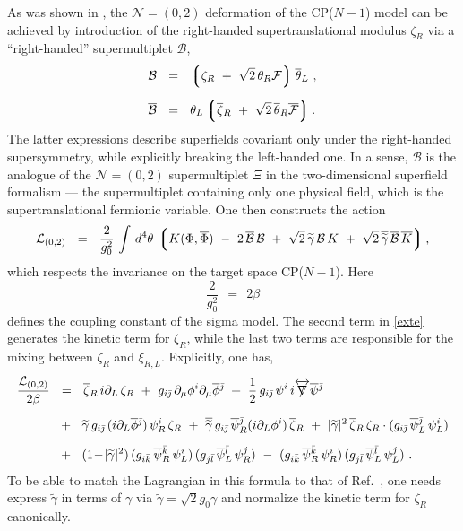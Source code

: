 \documentclass[12pt]{article}
\def\beq{\begin{equation}}
\def\eeq{\end{equation}}
\newcommand{\ntwoo}{${\mathcal N}= \left(0,2\right) $ }
\newcommand{\p}{\partial}
\newcommand{\wt}{\widetilde}
\newcommand{\ov}{\overline}
\newcommand{\mc}[1]{\mathcal{#1}}
\newcommand{\lgr}{\left\lgroup}
\newcommand{\rgr}{\right\rgroup}
\def\slashed#1{\setbox0=\hbox{$#1$}             %
   \dimen0=\wd0                                 %
   \setbox1=\hbox{/} \dimen1=\wd1               %
   \ifdim\dimen0>\dimen1                        %
      \rlap{\hbox to \dimen0{\hfil/\hfil}}      %
      #1                                        %
   \else                                        %
      \rlap{\hbox to \dimen1{\hfil$#1$\hfil}}   %
      /                                         %
   \fi}                                        %
\newcommand{\bzr}{\ov{\zeta}{}_R}
\newcommand{\zr}{\zeta_R}
\newcommand{\tgamma}{\wt{\gamma}}
\begin{document}
	As was shown in \cite{SYhet},  the \ntwoo deformation of the CP($N-1$) model can be achieved by
	introduction of the right-handed supertranslational modulus $ \zeta_R $ via a ``right-handed'' 
	supermultiplet $ \mc{B} $,
\begin{align*}
%
	\mc{B} & ~~=~~ \lgr \zr ~+~ \sqrt{2}\,\theta_R\mc{F} \rgr \ov{\theta}{}_L~, \\[2mm]
%
	\ov{\mc{B}} & ~~=~~ \theta_L \lgr \bzr ~+~ \sqrt{2}\, \ov{\theta}{}_R \ov{\mc{F}} \rgr.
\end{align*}
	The latter expressions describe superfields covariant only under the right-handed supersymmetry, 
	while explicitly breaking the left-handed one.
	In a sense, $ \mc{B} $ is the analogue of the \ntwoo supermultiplet $\Xi$ in the two-dimensional 
	superfield formalism \cite{Edalati} ---
	the supermultiplet containing only one physical field, which is the supertranslational
	fermionic variable.
	One then constructs the action 
\beq
\label{exte}
	\mc{L}_{(0,2)} ~~=~~ \frac{2}{g_0^2}\, \int\, d^4\theta\, \lgr K(\Phi,\ov{\Phi}) 
		~-~ 2\, \ov{\mc{B}}\,\mc{B}  ~+~  \sqrt{2}\,\tgamma\,\mc{B}\,K  
					     ~+~ \sqrt{2}\,\ov{\tgamma}\,\ov{\mc{B}}\,\ov{K} \rgr,
\eeq
	which respects the invariance on the target space CP($N-1$).
	Here
\[
	\frac{2}{g_0^2} ~~=~~ 2\beta
\]
	defines the coupling constant of the sigma model.
	The second term in \eqref{exte} generates the kinetic term for $ \zr $, while the last two terms 
	are responsible for the mixing between $ \zr $ and $ \xi_{R,L} $.
	Explicitly, one has,
\begin{align}
%
\notag
	\frac{\mc{L}_{(0,2)}}{2\beta}
                    & ~~=~~  \bzr\, i\p_L\, \zr 
			~+~ g_{i\bj}\,\p_\mu \phi^i \p_\mu\ov{\phi}{}^\bj
			~+~ \frac{1}{2}\, g_{i\bj}\, \psi^i\, i\overleftrightarrow{\slashed{\nabla}} \ov{\psi}{}^\bj 
	\\[2mm]
%
\label{cpn-1g}
			& 
			~~+~~ \tgamma\, g_{i\bj}\, (i \p_L \ov{\phi}{}^\bj)\, \psi_R^i\, \zr
			~+~ \ov{\tgamma}\, g_{i\bj}\, \ov{\psi}{}_R^\bj (i \p_L \phi^i)\, \bzr
			~+~ |\tgamma|^2\, \bzr\,\zr \cdot ( g_{i\bj}\, \ov{\psi}{}_L^\bj\, \psi_L^i )
	\\[2mm]
%
\notag
			& 
			~~+~~ (1 \!-\! |\tgamma|^2)\, (g_{i\bk}\, \ov{\psi}{}_R^\bk\, \psi_L^i)\,
						     (g_{j\bl}\, \ov{\psi}{}_L^\bl\, \psi_R^j)
			~-~ (g_{i\bk}\, \ov{\psi}{}_R^\bk\, \psi_R^i)\, (g_{j\bl}\, \ov{\psi}{}_L^\bl\, \psi_L^j)~.
\end{align}
	To be able to match the Lagrangian in this formula to that of Ref.~\cite{SYhet},
	one needs express $ \tgamma $ in terms of $ \gamma $ via
$ \tgamma = \sqrt{2}g_0\gamma $ and normalize the kinetic term for $ \zr $ 
	canonically.
	
\end{document}
